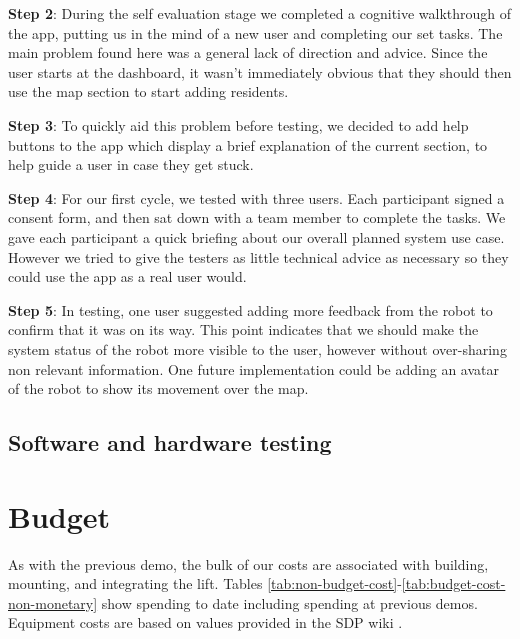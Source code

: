 \documentclass{article}
\begin{document}
{\bf Step 2}: During the self evaluation stage we completed a cognitive walkthrough of the app, putting us in the mind of a new user and completing our set tasks. The main problem found here was a general lack of direction and advice. Since the user starts at the dashboard, it wasn't immediately obvious that they should then use the map section to start adding residents.

{\bf Step 3}: To quickly aid this problem before testing, we decided to add help buttons to the app which display a brief explanation of the current section, to help guide a user in case they get stuck.

{\bf Step 4}: For our first cycle, we tested with three users. Each participant signed a consent form, and then sat down with a team member to complete the tasks. We gave each participant a quick briefing about our overall planned system use case. However we tried to give the testers as little technical advice as necessary so they could use the app as a real user would. 

{\bf Step 5}: In testing, one user suggested adding more feedback from the robot to confirm that it was on its way. This point indicates that we should make the system status of the robot more visible to the user, however without over-sharing non relevant information. One future implementation could be adding an avatar of the robot to show its movement over the map.

\subsection{Software and hardware testing}

\section{Budget}
As with the previous demo, the bulk of our costs are associated with building, mounting, and integrating the lift. Tables \ref{tab:non-budget-cost}-\ref{tab:budget-cost-non-monetary} show spending to date including spending at previous demos. Equipment costs are based on values provided in the SDP wiki \cite{sdpcosts}.

\begin{table}[h]
\begin{center}
\caption{Non-budgeted monetary costs at demo \demoNumber. Note that we have chosen to stop using the EV3 and instead use the Arduino kit.}
\label{tab:non-budget-cost}
\end{center}
\end{table}
\end{document}
